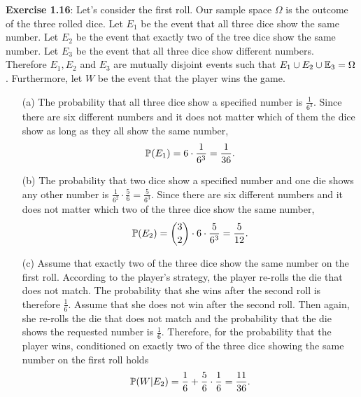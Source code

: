 \textbf{Exercise 1.16}: Let's consider the first roll. Our sample space $\Omega$
is the outcome of the three rolled dice. Let $E_1$ be the event that all three dice
show the same number. Let $E_2$ be the event that exactly two of the tree dice show
the same number. Let $E_3$ be the event that all three dice show different numbers.
Therefore $E_1, E_2$ and $E_3$ are mutually disjoint events such that
$E_1 \cup E_2 \cup \mathbb{E}_3 = \Omega$. Furthermore, let $W$ be the event that the
player wins the game.
\begin{enumerate}
  \item[(a)] The probability that all three dice show a specified number is
    $\frac{1}{6^3}$. Since there are six different numbers and it does not matter
    which of them the dice show as long as they all show the same number,
    \[ \mathbb{P}(E_1) = 6 \cdot \frac{1}{6^3} = \frac{1}{36}.\]

  \item[(b)] The probability that two dice show a specified number and one die
    shows any other number is $\frac{1}{6^2} \cdot \frac{5}{6} = \frac{5}{6^3}$.
    Since there are six different numbers and it does not matter which two of the
    three dice show the same number,
    \[ \mathbb{P}(E_2) = \binom{3}{2} \cdot 6 \cdot \frac{5}{6^3} = \frac{5}{12}.\]

  \item[(c)] Assume that exactly two of the three dice show the same number on
    the first roll. According to the player's strategy, the player re-rolls the
    die that does not match. The probability that she wins after the second roll
    is therefore $\frac{1}{6}$. Assume that she does not win after the second roll.
    Then again, she re-rolls the die that does not match and the probability that
    the die shows the requested number is $\frac{1}{6}$. Therefore, for the
    probability that the player wins, conditioned on exactly two of the three dice
    showing the same number on the first roll holds
    \[ \mathbb{P}(W|E_2) =\frac{1}{6} + \frac{5}{6} \cdot \frac{1}{6} = \frac{11}{36}. \]


\end{enumerate}
